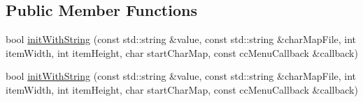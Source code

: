 \subsection*{Public Member Functions}
\begin{DoxyCompactItemize}
\item 
bool \hyperlink{classMenuItemAtlasFont_a72356ec71430cdd8b632e28bd8ec47d5}{init\+With\+String} (const std\+::string \&value, const std\+::string \&char\+Map\+File, int item\+Width, int item\+Height, char start\+Char\+Map, const cc\+Menu\+Callback \&callback)
\item 
bool \hyperlink{classMenuItemAtlasFont_a72356ec71430cdd8b632e28bd8ec47d5}{init\+With\+String} (const std\+::string \&value, const std\+::string \&char\+Map\+File, int item\+Width, int item\+Height, char start\+Char\+Map, const cc\+Menu\+Callback \&callback)
\end{DoxyCompactItemize}
